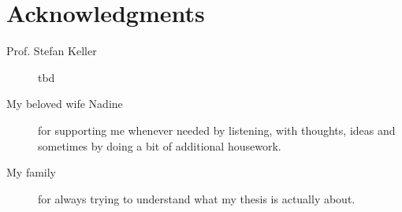 
\chapter*{Acknowledgments}

\begin{description}
    \item[Prof. Stefan Keller] tbd
    \item[My beloved wife Nadine] for supporting me whenever needed by listening, with thoughts, ideas and sometimes by doing a bit of additional housework.
    \item[My family] for always trying to understand what my thesis is actually about.
\end{description}